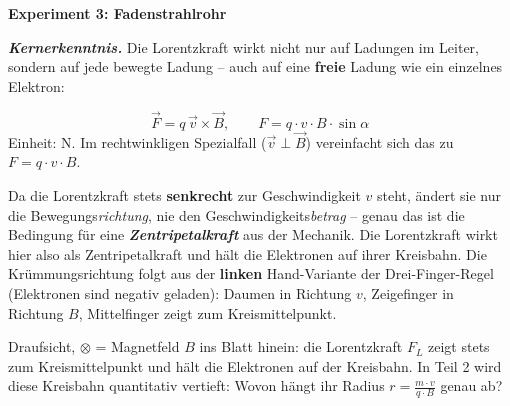 \documentclass[11pt,a4paper]{exam}
\newenvironment{theoriebox}[1][Theorie]{%
  \par\addvspace{10pt}\noindent\textbf{#1}\par\smallskip\noindent
}{%
  \par\addvspace{10pt}
}
\begin{document}
\begin{theoriebox}[Experiment 3: Fadenstrahlrohr]
\textbf{\emph{Kernerkenntnis.}} Die Lorentzkraft wirkt nicht nur auf
Ladungen im Leiter, sondern auf jede bewegte Ladung -- auch auf eine
\textbf{freie} Ladung wie ein einzelnes Elektron:
\begin{formelbox}[Lorentzkraft]
\[
  \vec F = q\,\vec v\times\vec B, \qquad F = q\cdot v\cdot B\cdot\sin\alpha
\]
Einheit: $\si{\newton}$. Im rechtwinkligen Spezialfall ($\vec v\perp\vec
B$) vereinfacht sich das zu $F=q\cdot v\cdot B$.
\end{formelbox}
Da die Lorentzkraft stets \textbf{senkrecht} zur Geschwindigkeit $v$
steht, ändert sie nur die Bewegungs\emph{richtung}, nie den
Geschwindigkeits\emph{betrag} -- genau das ist die Bedingung für eine
\textbf{\emph{Zentripetalkraft}} aus der Mechanik. Die Lorentzkraft wirkt
hier also als Zentripetalkraft und hält die Elektronen auf ihrer
Kreisbahn. Die Krümmungsrichtung folgt aus der \textbf{linken}
Hand-Variante der Drei-Finger-Regel (Elektronen sind negativ geladen):
Daumen in Richtung $v$, Zeigefinger in Richtung $B$, Mittelfinger zeigt
zum Kreismittelpunkt.
\begin{center}
\end{center}
{\scriptsize Draufsicht, $\otimes$ = Magnetfeld $B$ ins Blatt hinein: die
Lorentzkraft $F_L$ zeigt stets zum Kreismittelpunkt und hält die
Elektronen auf der Kreisbahn.}
In Teil 2 wird diese Kreisbahn quantitativ vertieft: Wovon hängt ihr
Radius $r=\frac{m\cdot v}{q\cdot B}$ genau ab?
\end{theoriebox}
\end{document}
